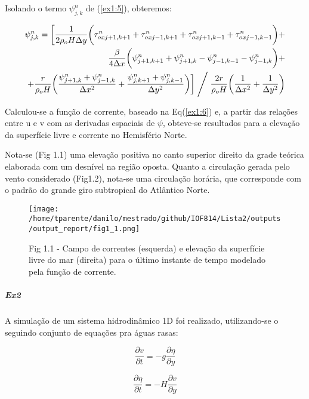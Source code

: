 \documentclass[11pt]{article}
\makeatletter
\def\maxwidth{\ifdim\Gin@nat@width>\linewidth\linewidth
    \else\Gin@nat@width\fi}
\let\Oldincludegraphics\includegraphics
\renewcommand{\includegraphics}[1]{\Oldincludegraphics[width=.8\maxwidth]{#1}}
\makeatother
\begin{document}
Isolando o termo \(\psi^{n}_{j,k}\) de (\ref{ex1:5}), obteremos:

\begin{equation}
\begin{aligned}
\psi^{n}_{j,k} = \bigg[ \frac{1}{2\rho_oH\Delta{y}}\bigg( \tau^{n}_{ox j+1,k+1} + \tau^{n}_{ox j-1,k+1} + \tau^{n}_{ox j+1,k-1} + \tau^{n}_{ox j-1,k-1} \bigg)  + \\
\frac{\beta}{4\Delta{x}}\bigg( \psi^{n}_{j+1,k+1} + \psi^{n}_{j+1,k} - \psi^{n}_{j-1,k-1} - \psi^{n}_{j-1,k} \bigg) + \\
+ \frac{r}{\rho_oH}\bigg( \frac{\psi^{n}_{j+1,k} + \psi^{n}_{j-1,k}}{\Delta{x^2}} + \frac{\psi^{n}_{j,k+1} + \psi^{n}_{j,k-1}}{\Delta{y^2}}\bigg)\bigg] \Biggm/ \frac{2r}{\rho_oH}\bigg( \frac{1}{\Delta{x^2}} + \frac{1}{\Delta{y^2}} \bigg)
\label{ex1:6}
\end{aligned}
\end{equation}

Calculou-se a função de corrente, baseado na Eq(\ref{ex1:6}) e, a partir
das relações entre u e v com as derivadas espaciais de \(\psi\),
obteve-se resultados para a elevação da superfície livre e corrente no
Hemisfério Norte.

Nota-se (Fig 1.1) uma elevação positiva no canto superior direito da
grade teórica elaborada com um desnível na região oposta. Quanto a
circulação gerada pelo vento considerado (Fig1.2), nota-se uma
circulação horária, que corresponde com o padrão do grande giro
subtropical do Atlântico Norte.

\begin{figure}
\centering
\centerline{\hbox{\texttt{[image: /home/tparente/danilo/mestrado/github/IOF814/Lista2/outputs/output\_report/fig1\_1.png]}}}
\caption{Fig 1.1 - Campo de correntes (esquerda) e elevação da superfície livre do mar (direita) para o último
 instante de tempo modelado pela função de corrente.}
\label{fig1:1}
\end{figure}

    \subparagraph{Ex2}\label{ex2}

A simulação de um sistema hidrodinâmico 1D foi realizado, utilizando-se
o seguindo conjunto de equações pra águas rasas:

\begin{equation}
    \frac{\partial{v}}{\partial{t}} = - g\frac{\partial{\eta}}{\partial{y}}
    \label{ex2:1}
\end{equation}

\begin{equation}
    \frac{\partial{\eta}}{\partial{t}} = -H\frac{\partial{v}}{\partial{y}}
    \label{ex2:2}
\end{equation}
\end{document}
